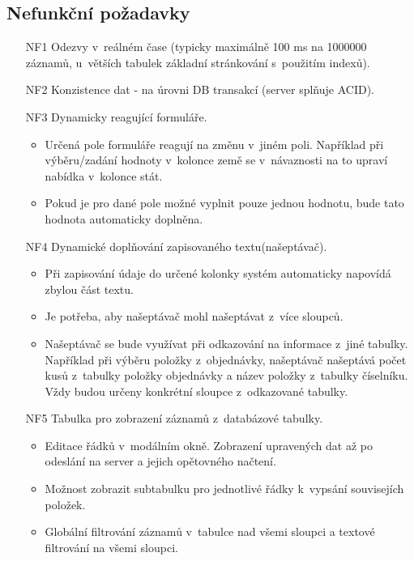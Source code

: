 \documentclass[thesis=B,czech]{FITthesis}[2012/06/26]
\begin{document}
\subsection{Nefunkční požadavky}
\begin{enumerate}
	\item[NF1] Odezvy v~reálném čase (typicky maximálně 100 ms na 1000000 záznamů, u~větších tabulek základní stránkování s~použitím indexů).
	\item[NF2] Konzistence dat - na úrovni DB transakcí (server splňuje ACID).
	\item[NF3] Dynamicky reagující formuláře.
	\begin{itemize}
		\item Určená pole formuláře reagují na změnu v~jiném poli. Například při výběru/zadání hodnoty v~kolonce země se v~návaznosti na to upraví nabídka v~kolonce stát. 
		\item Pokud je pro dané pole možné vyplnit pouze jednou hodnotu, bude tato hodnota automaticky doplněna.
	\end{itemize}
	\item[NF4] Dynamické doplňování zapisovaného textu(našeptávač).
	\begin{itemize}
		\item Při zapisování údaje do určené kolonky systém automaticky napovídá zbylou část textu.
		\item Je potřeba, aby našeptávač mohl našeptávat z~více sloupců.
		\item Našeptávač se bude využívat při odkazování na informace z~jiné tabulky. Například při výběru položky z~objednávky, našeptávač našeptává počet kusů z~tabulky položky objednávky a název položky z~tabulky číselníku. Vždy budou určeny konkrétní sloupce z~odkazované tabulky.
	\end{itemize}
	\item[NF5] Tabulka pro zobrazení záznamů z~databázové tabulky.
	\begin{itemize}
		\item Editace řádků v~modálním okně. Zobrazení upravených dat až po odeslání na server a jejich opětovného načtení.
		\item Možnost zobrazit subtabulku pro jednotlivé řádky k~vypsání souvisejích položek.
		\item Globální filtrování záznamů v~tabulce nad všemi sloupci a textové filtrování na všemi sloupci.
	\end{itemize}
\end{enumerate}
\end{document}

